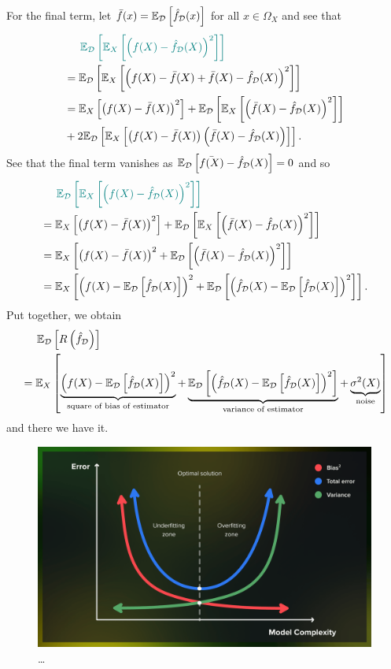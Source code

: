 \documentclass[11pt]{article}
\begin{document}
For the final term, let $\bar{f}(x)=\mathbb{E}_{\mathcal{D}}\left[\hat{f}_{\mathcal{D}}(x)\right]$ for all $x\in\Omega_X$ and see that
\begin{align*}
    &\hspace{14.52pt}
    \textcolor{c11}{\E_{\D}\l[\E_X\l[\l(f(X)-\hat{f}_{\D}(X)\r)^2\r]\r]}\\
    &=
    \E_{\D}\l[\E_X\l[\l(f(X)-\bar{f}(X)+\bar{f}(X)-\hat{f}_{\D}(X)\r)^2\r]\r]\\
    &=
    \E_X\l[\l(f(X)-\bar{f}(X)\r)^2\r]+\E_{\D}\l[\E_X\l[\l(\bar{f}(X)-\hat{f}_{\D}(X)\r)^2\r]\r]\\
    &+
    2\E_{\D}\l[\E_X\l[\l(f(X)-\bar{f}(X)\r)\l(\bar{f}(X)-\hat{f}_{\D}(X)\r)\r]\r].
\end{align*}
See that the final term vanishes as $\mathbb{E}_{\mathcal{D}}\left[\bar{f(X)}-\hat{f}_{\mathcal{D}}(X)\right]=0$ and so
\begin{align*}
    &\hspace{14.52pt}
    \textcolor{c11}{\E_{\D}\l[\E_X\l[\l(f(X)-\hat{f}_{\D}(X)\r)^2\r]\r]}\\
    &=
    \E_X\l[\l(f(X)-\bar{f}(X)\r)^2\r]+\E_{\D}\l[\E_X\l[\l(\bar{f}(X)-\hat{f}_{\D}(X)\r)^2\r]\r]\\
    &=
    \E_X\l[\l(f(X)-\bar{f}(X)\r)^2+\E_{\D}\l[\l(\bar{f}(X)-\hat{f}_{\D}(X)\r)^2\r]\r]\\
    &=
    \E_X\l[\l(f(X)-\E_{\D}\l[\hat{f}_{\D}(X)\r]\r)^2+\E_{\D}\l[\l(\hat{f}_{\D}(X)-\E_{\D}\l[\hat{f}_{\D}(X)\r]\r)^2\r]\r].
\end{align*}
Put together, we obtain
\begin{align*}
    &\hspace{14.52pt}
    \mathbb{E}_{\mathcal{D}}\left[R\left(\hat{f}_{\mathcal{D}}\right)\right]\\
    &=
    \mathbb{E}_X\left[\underbrace{\left(f(X)-\mathbb{E}_{\mathcal{D}}\left[\hat{f}_{\mathcal{D}}(X)\right]\right)^2}_{\text{square of bias of estimator}}+\underbrace{\mathbb{E}_{\mathcal{D}}\left[\left(\hat{f}_{\mathcal{D}}(X)-\mathbb{E}_{\mathcal{D}}\left[\hat{f}_{\mathcal{D}}(X)\right]\right)^2\right]}_{\text{variance of estimator}}+\underbrace{\sigma^2(X)}_{\text{noise}}\right]
\end{align*}
and there we have it.

\begin{figure}[ht]
    \centering
    \includegraphics[width=\columnwidth]{./figures/supervised_learning/bias_variance.png}
    \caption{\dots}
    \label{fig:bias_variance}
\end{figure}
\end{document}
